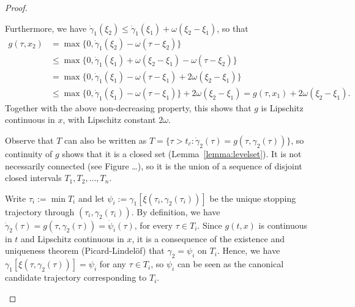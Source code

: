 \documentclass[a4paper]{article}
\theoremstyle{definition}
\theoremstyle{plain}
\begin{document}
\begin{proof}
\begin{outline}
  \2 Furthermore, we have
  $\dot{\gamma}_{1}(\xi_{2}) \leq \dot{\gamma}_{1}(\xi_{1}) + \omega(\xi_{2} - \xi_{1})$,
  so that
  \begin{align*}
    g(\tau, x_{2}) &= \max\{0, \dot{\gamma}_{1}(\xi_{2}) - \omega(\tau - \xi_{2}) \} \\
    &\leq \max\{0, \dot{\gamma}_{1}(\xi_{1}) + \omega(\xi_{2} - \xi_{1}) - \omega(\tau - \xi_{2}) \} \\
    &= \max\{0, \dot{\gamma}_{1}(\xi_{1}) - \omega(\tau-\xi_{1}) + 2\omega(\xi_{2} - \xi_{1}) \} \\
    &\leq \max\{0, \dot{\gamma}_{1}(\xi_{1}) - \omega(\tau - \xi_{1}) \} + 2\omega(\xi_{2} - \xi_{1})
      = g(\tau, x_{1}) + 2\omega(\xi_{2} - \xi_{1}) .
  \end{align*}
  Together with the above non-decreasing property, this shows that $g$ is
  Lipschitz continuous in $x$, with Lipschitz constant $2\omega$.

  \1 Observe that $T$ can also be written as
  $T = \{ \tau > t_{c} : \dot{\gamma}_{2}(\tau) = g(\tau, \gamma_{2}(\tau)) \}$,
  so continuity of $g$ shows that it is a closed set
  (Lemma~\ref{lemma:levelset}). It is not necessarily connected (see Figure
  \dots), so it is the union of a sequence of disjoint closed intervals
  $T_{1}, T_{2}, \dots, T_{n}$.

  \2 Write $\tau_{i} := \min T_{i}$ and let
  $\psi_{i} := \gamma_{1}[\xi(\tau_{i}, \gamma_{2}(\tau_{i}))]$ be the unique stopping trajectory
  through $(\tau_{i}, \gamma_{2}(\tau_{i}))$.
  By definition, we have $\dot{\gamma}_{2}(\tau) = g(\tau, \gamma_{2}(\tau)) = \dot{\psi}_{i}(\tau)$, for every $\tau \in T_{i}$.
  Since $g(t, x)$ is continuous in $t$ and Lipschitz continuous in $x$, it is a
  consequence of the existence and uniqueness theorem (Picard-Lindel{\"o}f) that
  $\gamma_{2} = \psi_{i}$ on $T_{i}$.
  Hence, we have $\gamma_{1}[\xi(\tau, \gamma_{2}(\tau))] = \psi_{i}$ for any
  $\tau \in T_{i}$, so $\psi_{i}$ can be seen as the canonical candidate
  trajectory corresponding to $T_{i}$.



\end{outline}
\end{proof}
\end{document}
